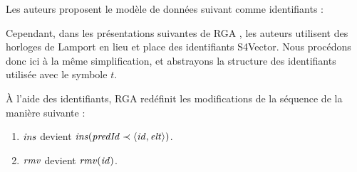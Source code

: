 Les auteurs proposent le modèle de données suivant comme identifiants :

\noindent{}

Cependant, dans les présentations suivantes de \ac{RGA} \cite{shapiro_2011_crdt, 2016-specification-complexity-collaborative-text-editing-attiya}, les auteurs utilisent des horloges de Lamport \cite{1978-happen-before-lamport} en lieu et place des identifiants S4Vector.
Nous procédons donc ici à la même simplification, et abstrayons la structure des identifiants utilisée avec le symbole $t$.

À l'aide des identifiants, \ac{RGA} redéfinit les modifications de la séquence de la manière suivante :
\begin{enumerate}
  \item $\mathit{ins}$ devient $\mathit{ins}(\mathit{predId} \prec \langle \mathit{id},\mathit{elt} \rangle)$.
  \item $\mathit{rmv}$ devient $\mathit{rmv}(\mathit{id})$.
\end{enumerate}


